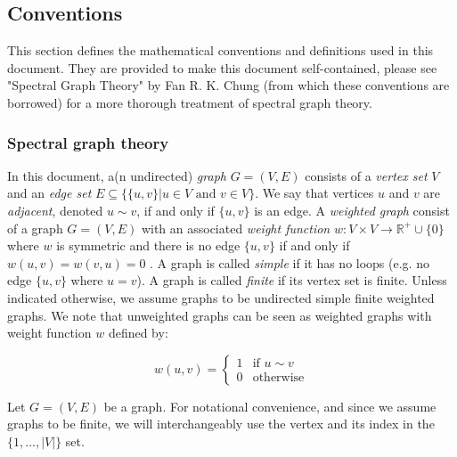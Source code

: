 \subsection{Conventions}

This section defines the mathematical conventions and definitions used in this document. They are provided to make this document self-contained, please see "Spectral Graph Theory" by Fan R. K. Chung \cite{chung1997spectral} (from which these conventions are borrowed) for a more thorough treatment of spectral graph theory.

\subsubsection{Spectral graph theory}
In this document, a(n undirected) \emph{graph} $G = (V, E)$ consists of a \emph{vertex set} $V$ and an \emph{edge set} $E \subseteq \{\{u, v\} | u \in V \text{ and } v \in V\}$. We say that vertices $u$ and $v$ are \emph{adjacent}, denoted $u \sim v$, if and only if $\{u,v\}$ is an edge. A \emph{weighted graph} consist of a graph $G = (V, E)$ with an associated \emph{weight function} $w : V \times V \rightarrow \mathbb{R}^+ \cup \{0\}$ where $w$ is symmetric and there is no edge $\{u,v\}$ if and only if $w(u,v) = w(v,u) = 0$ . A graph is called \emph{simple} if it has no loops (e.g. no edge $\{u, v\}$ where $u = v$). A graph is called \emph{finite} if its vertex set is finite. Unless indicated otherwise, we assume graphs to be undirected simple finite weighted graphs. We note that unweighted graphs can be seen as weighted graphs with weight function $w$ defined by:

\[
w(u,v) = \begin{cases}
1 & \text{if }u \sim v \\
0 & \text{otherwise}
\end{cases}
\]

Let $G = (V,E)$ be a graph. For notational convenience, and since we assume graphs to be finite, we will interchangeably use the vertex and its index in the $\{1, ..., |V|\}$ set. 

